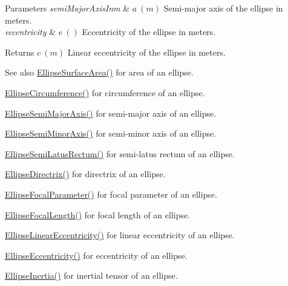 \begin{DoxyParams}{Parameters}
{\em semi\+Major\+Axis\+Inm} & $ a\ (m)$ Semi-\/major axis of the ellipse in meters. \\
\hline
{\em eccentricity} & $ e\ ()$ Eccentricity of the ellipse in meters. \\
\hline
\end{DoxyParams}
\begin{DoxyReturn}{Returns}
$ c\ (m)$ Linear eccentricity of the ellipse in meters. 
\end{DoxyReturn}
\begin{DoxySeeAlso}{See also}
\mbox{\hyperlink{group___e_g_x_math-_geometry-2_d-_ellipse-_surface_area_ga4ce8c8323e9718ce5458f4ab7f6d823d}{Ellipse\+Surface\+Area()}} for area of an ellipse. 

\mbox{\hyperlink{group___e_g_x_math-_geometry-2_d-_ellipse-_circumference_ga4172802ac674eb53467b44928ac635c7}{Ellipse\+Circumference()}} for circumference of an ellipse. 

\mbox{\hyperlink{group___e_g_x_math-_geometry-2_d-_ellipse-_semi_major_axis_ga646a2ca065f4ac3f666a9ea22f3bb527}{Ellipse\+Semi\+Major\+Axis()}} for semi-\/major axis of an ellipse. 

\mbox{\hyperlink{group___e_g_x_math-_geometry-2_d-_ellipse-_semi_minor_axis_gae461acf3333565d69527dd86e9aa2b32}{Ellipse\+Semi\+Minor\+Axis()}} for semi-\/minor axis of an ellipse. 

\mbox{\hyperlink{group___e_g_x_math-_geometry-2_d-_ellipse-_semi_latus_rectum_gacfd1844eb4ef3d1ee3c0b460a6442ae6}{Ellipse\+Semi\+Latus\+Rectum()}} for semi-\/latus rectum of an ellipse. 

\mbox{\hyperlink{group___e_g_x_math-_geometry-2_d-_ellipse-_directrix_gace8f72a8efbc9c18d3eb689151405106}{Ellipse\+Directrix()}} for directrix of an ellipse. 

\mbox{\hyperlink{group___e_g_x_math-_geometry-2_d-_ellipse-_focal_parameter_ga4cd01a38c72c092ef9791351948bf69b}{Ellipse\+Focal\+Parameter()}} for focal parameter of an ellipse. 

\mbox{\hyperlink{group___e_g_x_math-_geometry-2_d-_ellipse-_focal_length_gab8d63de7640c880cfecaeada6f2afdac}{Ellipse\+Focal\+Length()}} for focal length of an ellipse. 

\mbox{\hyperlink{group___e_g_x_math-_geometry-2_d-_ellipse-_linear_eccentricity_gac70b3010e30aa8b73deb50fe2b9b9a91}{Ellipse\+Linear\+Eccentricity()}} for linear eccentricity of an ellipse. 

\mbox{\hyperlink{group___e_g_x_math-_geometry-2_d-_ellipse-_eccentricity_ga6a0a7fba17f782616894cfc447628c33}{Ellipse\+Eccentricity()}} for eccentricity of an ellipse. 

\mbox{\hyperlink{group___e_g_x_math-_geometry-2_d-_ellipse-_inertia_ga10a3049c2f04b50f271fb01dc62e4cf8}{Ellipse\+Inertia()}} for inertial tensor of an ellipse. 
\end{DoxySeeAlso}
